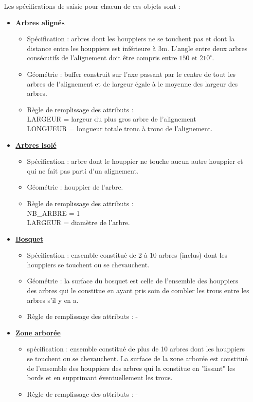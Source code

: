\documentclass[11pt]{article}
\begin{document}
Les spécifications de saisie pour chacun de ces objets sont :
\begin{itemize}[label=$\bullet$]
	\item \underline{\textbf{Arbres alignés}}
	\begin{itemize}
		\item Spécification : arbres dont les houppiers ne se touchent pas et dont la distance entre les houppiers est inférieure à 3m. L'angle entre deux arbres consécutifs de l'alignement doit être compris entre $150$ et $210^{\circ}$.
		\item Géométrie : buffer construit sur l'axe passant par le centre de tout les arbres de l'alignement et de largeur égale à le moyenne des largeur des arbres.
		\item Règle de remplissage des attributs : \\
		LARGEUR = largeur du plus gros arbre de l'alignement\\
		LONGUEUR = longueur totale tronc à tronc de l'alignement.
	\end{itemize}
	\item \underline{\textbf{Arbres isolé}}
	\begin{itemize}
		\item Spécification : arbre dont le houppier ne touche aucun autre houppier et qui ne fait pas parti d'un alignement.
		\item Géométrie : houppier de l'arbre.
		\item Règle de remplissage des attributs : \\
		NB\_ARBRE = 1\\
		LARGEUR = diamètre de l'arbre.
	\end{itemize}
	\item \underline{\textbf{Bosquet}}
	\begin{itemize}
		\item Spécification : ensemble constitué de 2 à 10 arbres (inclus) dont les houppiers se touchent ou se chevauchent.
		\item Géométrie : la surface du bosquet est celle de l'ensemble des houppiers des arbres qui le constitue en ayant pris soin de combler les trous entre les arbres s'il y en a.
		\item Règle de remplissage des attributs : - \\
	\end{itemize}
	\item \underline{\textbf{Zone arborée}}
	\begin{itemize}
		\item spécification : ensemble constitué de plus de 10 arbres dont les houppiers se touchent ou se chevauchent. La surface de la zone arborée est constitué de l'ensemble des houppiers des arbres qui la constitue en "lissant" les bords et en supprimant éventuellement les trous.
		\item Règle de remplissage des attributs : - \\
	\end{itemize}
\end{itemize}
\end{document}
